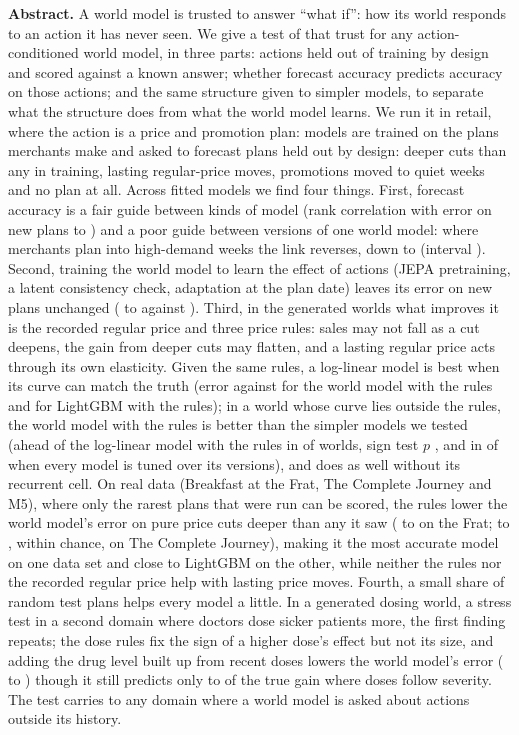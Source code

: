{\small
\textbf{Abstract.} A world model is trusted to answer ``what if'': how its world responds to an action it has never
seen. We give a test of that trust for any action-conditioned world model, in three parts: actions held out of
training by design and scored against a known answer; whether forecast accuracy predicts accuracy on those actions;
and the same structure given to simpler models, to separate what the structure does from what the world model
learns. We run it in retail, where the action is a price and promotion plan: models are trained on the plans
merchants make and asked to forecast plans held out by design: deeper cuts than any in training, lasting regular-price moves, promotions moved to quiet weeks and no
plan at all. Across \nFits{} fitted models we find four things. First, forecast accuracy is a fair guide between
kinds of model (rank correlation with error on new plans \linkAllMin{} to \linkAllMax{}) and a poor guide between
versions of one world model: where merchants plan into high-demand weeks the link reverses, down to \linkBWmOne{}
(interval \linkBWmOneCi{}). Second, training the world model to learn the effect of actions (JEPA pretraining, a
latent consistency check, adaptation at the plan date) leaves its error on new plans unchanged (\errLActLo{} to
\errLActHi{} against \errLWm{}). Third, in the generated worlds what improves it is the recorded regular price and three price rules: sales may
not fall as a cut deepens, the gain from deeper cuts may flatten, and a lasting regular price acts through its own
elasticity. Given the same rules, a log-linear model is best when its curve can match the truth (error \errBLlShape{}
against \errBShape{} for the world model with the rules and \errBLgbShape{} for LightGBM with the rules); in a world
whose curve lies outside the rules, the world model with the rules is better than the simpler models we tested
(ahead of the log-linear model with the rules in \hhBaseKWmLlWon{} of \hhBaseKWmLlN{} worlds, sign test $p$
\hhBaseKWmLlP{}, and in \hhMedKWmLlWon{} of \hhMedKWmLlN{} when every model is tuned over its versions), and does as well without its recurrent cell. On real data
(Breakfast at the Frat, The Complete Journey and M5), where only the rarest plans that were run can be scored, the
rules lower the world model's error on pure price cuts deeper than any it saw (\reFPureWm{} to \reFPureWmShape{} on
the Frat; \reCPureWm{} to \reCPureWmShape{}, within chance, on The Complete Journey), making it the most accurate model on one data set and close to LightGBM on the
other, while neither the rules nor the recorded regular price help with lasting price moves. Fourth, a small share of random test plans helps every model a little. In a generated dosing world, a stress test in a second domain where doctors
dose sicker patients more, the first finding repeats; the dose rules fix the sign of a higher dose's effect but not its
size, and adding the drug level built up from recent doses lowers the world model's error (\dsShapeErr{} to
\dsExpShapeErr{}) though it still predicts only \dsExpRatioLo{} to \dsExpRatioHi{} of the true gain where doses
follow severity. The test carries to any domain where a world model is asked about actions outside its history.
\par}
